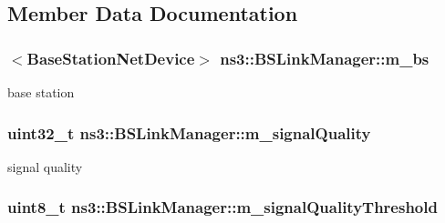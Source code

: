 \subsection{Member Data Documentation}
\subsubsection[{\texorpdfstring{m\+\_\+bs}{m_bs}}]{$<${\bf Base\+Station\+Net\+Device}$>$ ns3\+::\+B\+S\+Link\+Manager\+::m\+\_\+bs\hspace{0.3cm}{\ttfamily [private]}}\hypertarget{classns3_1_1BSLinkManager_a03e8b376dd28651abfeded291ea52fc8}{}\label{classns3_1_1BSLinkManager_a03e8b376dd28651abfeded291ea52fc8}


base station 

\subsubsection[{\texorpdfstring{m\+\_\+signal\+Quality}{m_signalQuality}}]{\setlength{\rightskip}{0pt plus 5cm}uint32\+\_\+t ns3\+::\+B\+S\+Link\+Manager\+::m\+\_\+signal\+Quality\hspace{0.3cm}{\ttfamily [private]}}\hypertarget{classns3_1_1BSLinkManager_afcbe9d8fc962a6a39f0c99adcf9b985c}{}\label{classns3_1_1BSLinkManager_afcbe9d8fc962a6a39f0c99adcf9b985c}


signal quality 

\subsubsection[{\texorpdfstring{m\+\_\+signal\+Quality\+Threshold}{m_signalQualityThreshold}}]{\setlength{\rightskip}{0pt plus 5cm}uint8\+\_\+t ns3\+::\+B\+S\+Link\+Manager\+::m\+\_\+signal\+Quality\+Threshold\hspace{0.3cm}{\ttfamily [private]}}\hypertarget{classns3_1_1BSLinkManager_a7f6d2a2b929aa3075d766569c40ce51b}{}\label{classns3_1_1BSLinkManager_a7f6d2a2b929aa3075d766569c40ce51b}


